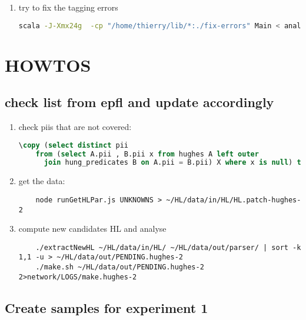 \documentclass[a4paper,11pt]{report}
\begin{document}
\begin{enumerate}
\begin{lstlisting}[language=SQL]
    \copy (select X.pii, X.hlno, A.tokno,
                  case when B.posbef = 'IN' then 'IN_' || B.tokbef else posbef end statbef,
                  case when B.posaft = 'IN' then 'IN_' || B.tokaft else B.posaft end stataft,
                  A.pos, A.token, A.lemma
           from bar X
           join  tokens A on A.pii = X.pii and A.hlno = X.hlno
           join  tokens_ctx1 B on B.pii = X.pii and B.hlno = X.hlno and A.tokno = B.tokno
           order by X.pii, X.hlno, A.tokno)
        to 'failure.tsv' with csv delimiter E'\t';
  \end{lstlisting}
\item try to fix the tagging errors
  \begin{lstlisting}[language=bash]
    scala -J-Xmx24g  -cp "/home/thierry/lib/*:./fix-errors" Main < analysis/failures.tsv > bar
  \end{lstlisting}
\end{enumerate}

  
\chapter{HOWTOS}
\section{check list from epfl and update accordingly}
\begin{enumerate}
\item check piis that are not covered:
  \begin{lstlisting}[language=SQL]
    \copy (select distinct pii
    from (select A.pii , B.pii x from hughes A left outer
      join hung_predicates B on A.pii = B.pii) X where x is null) to 'UNKNOWNS';
  \end{lstlisting}
\item get the data:
  \begin{lstlisting}
    node runGetHLPar.js UNKNOWNS > ~/HL/data/in/HL/HL.patch-hughes-2
  \end{lstlisting}
\item compute new candidates HL and analyse
  \begin{lstlisting}
    ./extractNewHL ~/HL/data/in/HL/ ~/HL/data/out/parser/ | sort -k 1,1 -u > ~/HL/data/out/PENDING.hughes-2
    ./make.sh ~/HL/data/out/PENDING.hughes-2 2>network/LOGS/make.hughes-2
  \end{lstlisting}  
\end{enumerate}

\section{Create samples for experiment 1}
\end{document}
